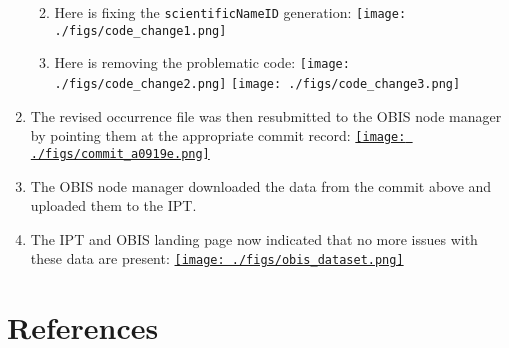 \documentclass[
]{book}
\providecommand{\tightlist}{%
  \setlength{\itemsep}{0pt}\setlength{\parskip}{0pt}}
\begin{document}
\begin{enumerate}
  \begin{enumerate}
  \def\labelenumii{\arabic{enumii}.}
  \tightlist
  \item
    Here is fixing the \texttt{scientificNameID} generation: \texttt{[image: ./figs/code\_change1.png]}
  \item
    Here is removing the problematic code: \texttt{[image: ./figs/code\_change2.png]} \texttt{[image: ./figs/code\_change3.png]}
  \end{enumerate}
\item
  The revised occurrence file was then resubmitted to the OBIS node manager by pointing them at the appropriate commit
  record:
  \href{https://github.com/ioos/bio_data_guide/commit/a0919e5b788b0737fc4c8e2c4b874c2e287769dd}{\texttt{[image: ./figs/commit\_a0919e.png]}}
\item
  The OBIS node manager downloaded the data from the commit above and uploaded them to the IPT.
\item
  The IPT and OBIS landing page now indicated that no more issues with these data are present:
  \href{https://obis.org/dataset/bc01451e-d990-4ad1-8315-e3fb6e9cf461}{\texttt{[image: ./figs/obis\_dataset.png]}}
\end{enumerate}

\hypertarget{references}{%
\chapter*{References}\label{references}}

\setlength{\parindent}{-0.2in}
\setlength{\leftskip}{0.2in}
\setlength{\parskip}{8pt}

\noindent
\end{document}
